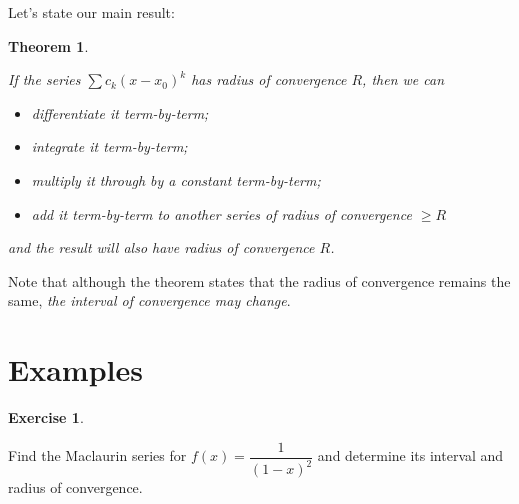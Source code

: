 \documentclass[
]{book}
\providecommand{\tightlist}{%
  \setlength{\itemsep}{0pt}\setlength{\parskip}{0pt}}
\newtheorem{theorem}{Theorem}[chapter]
\theoremstyle{definition}
\theoremstyle{definition}
\theoremstyle{definition}
\newtheorem{exercise}{Exercise}[chapter]
\theoremstyle{definition}
\theoremstyle{remark}
\begin{document}
Let's state our main result:

\begin{theorem}
\protect\hypertarget{thm:unlabeled-div-245}{}\label{thm:unlabeled-div-245}

If the series \(\sum c_k(x-x_0)^k\) has radius of convergence \(R\), then we can

\begin{itemize}
\tightlist
\item
  differentiate it term-by-term;
\item
  integrate it term-by-term;
\item
  multiply it through by a constant term-by-term;
\item
  add it term-by-term to another series of radius of convergence \(\geq R\)
\end{itemize}

and the result will also have radius of convergence \(R\).

\end{theorem}

Note that although the theorem states that the radius of convergence remains the same, \emph{the interval of convergence may change}.

\hypertarget{examples}{%
\section{Examples}\label{examples}}

\begin{exercise}
\protect\hypertarget{exr:unlabeled-div-246}{}\label{exr:unlabeled-div-246}

Find the Maclaurin series for \(f(x)=\dfrac{1}{(1-x)^2}\) and determine its interval and radius of convergence.

\end{exercise}
\end{document}
